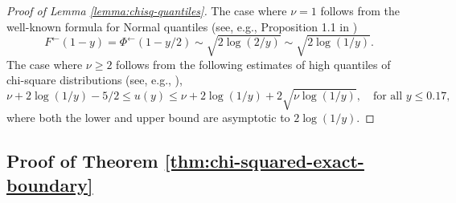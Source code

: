 \begin{proof}[Proof of Lemma \ref{lemma:chisq-quantiles}]
The case where $\nu=1$ follows from the well-known formula for Normal quantiles (see, e.g., Proposition 1.1 in \cite{gao2018fundamental})
$$
F^\leftarrow(1 - y) = \Phi^\leftarrow(1-y/2)\sim\sqrt{2\log{(2/y)}}\sim\sqrt{2\log{(1/y)}}.
$$
The case where $\nu\ge2$ follows from the following estimates of high quantiles of chi-square distributions (see, e.g., \citep{inglot2010inequalities}),
$$
    \nu +  2\log(1/y) -5/2 \le u(y) \le \nu +  2\log(1/y) + 2\sqrt{\nu\log(1/y)}, \quad \text{for all }y\le0.17,
$$
where both the lower and upper bound are asymptotic to $2\log(1/y)$.
\end{proof}


\subsection{Proof of Theorem \ref{thm:chi-squared-exact-boundary}}
\label{subsec:proof-chi-squared-exact-boundary}

